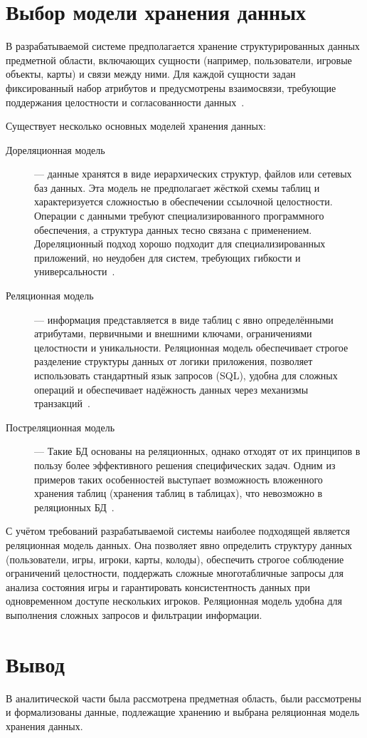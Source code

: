 \section{Выбор модели хранения данных}

В разрабатываемой системе предполагается хранение структурированных данных предметной области, включающих сущности (например, пользователи, игровые объекты, карты) и связи между ними. Для каждой сущности задан фиксированный набор атрибутов и предусмотрены взаимосвязи, требующие поддержания целостности и согласованности данных~\cite{lectures}.

Существует несколько основных моделей хранения данных:

\begin{description}
    \item[Дореляционная модель] --- данные хранятся в виде иерархических структур, файлов или сетевых баз данных. Эта модель не предполагает жёсткой схемы таблиц и характеризуется сложностью в обеспечении ссылочной целостности. Операции с данными требуют специализированного программного обеспечения, а структура данных тесно связана с применением. Дореляционный подход хорошо подходит для специализированных приложений, но неудобен для систем, требующих гибкости и универсальности~\cite{lectures}.

    \item[Реляционная модель] --- информация представляется в виде таблиц с явно определёнными атрибутами, первичными и внешними ключами, ограничениями целостности и уникальности. Реляционная модель обеспечивает строгое разделение структуры данных от логики приложения, позволяет использовать стандартный язык запросов (SQL), удобна для сложных операций и обеспечивает надёжность данных через механизмы транзакций~\cite{date}.

    \item[Постреляционная модель] --- Такие БД основаны на реляционных, однако отходят от их принципов в пользу более эффективного решения специфических задач. Одним из примеров таких особенностей выступает возможность вложенного хранения таблиц (хранения таблиц в таблицах), что невозможно в реляционных БД~\cite{postrel}.
\end{description}

С учётом требований разрабатываемой системы наиболее подходящей является реляционная модель данных. Она позволяет явно определить структуру данных (пользователи, игры, игроки, карты, колоды), обеспечить строгое соблюдение ограничений целостности, поддержать сложные многотабличные запросы для анализа состояния игры и гарантировать консистентность данных при одновременном доступе нескольких игроков. Реляционная модель удобна для выполнения сложных запросов и фильтрации информации.


\section*{Вывод}

В аналитической части была рассмотрена предметная область, были рассмотрены и формализованы данные, подлежащие хранению и выбрана реляционная модель хранения данных.